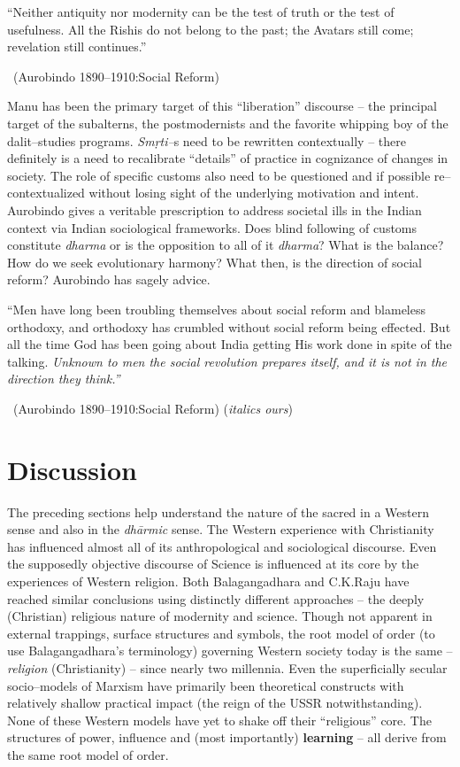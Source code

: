 \begin{myquote}
“Neither antiquity nor modernity can be the test of truth or the test of usefulness. All the Rishis do not belong to the past; the Avatars still come; revelation still continues.” 

~\hfill (Aurobindo 1890–1910:Social Reform)
\end{myquote}

Manu has been the primary target of this “liberation” discourse – the principal target of the subalterns, the postmodernists and the favorite whipping boy of the dalit–studies programs. \textit{Smṛti–}s need to be rewritten contextually – there definitely is a need to recalibrate “details” of practice in cognizance of changes in society. The role of specific customs also need to be questioned and if possible re–contextualized without losing sight of the underlying motivation and intent. Aurobindo gives a veritable prescription to address societal ills in the Indian context via Indian sociological frameworks. Does blind following of customs constitute \textit{dharma} or is the opposition to all of it \textit{dharma}? What is the balance? How do we seek evolutionary harmony? What then, is the direction of social reform? Aurobindo has sagely advice.

\begin{myquote}
“Men have long been troubling themselves about social reform and blameless orthodoxy, and orthodoxy has crumbled without social reform being effected. But all the time God has been going about India getting His work done in spite of the talking. \textit{Unknown to men the social revolution prepares itself, and it is not in the direction they think.”} 

~\hfill (Aurobindo 1890–1910:Social Reform) (\textit{italics ours})
\end{myquote}


\section*{Discussion}

The preceding sections help understand the nature of the sacred in a Western sense and also in the \textit{dhārmic} sense. The Western experience with Christianity has influenced almost all of its anthropological and sociological discourse. Even the supposedly objective discourse of Science is influenced at its core by the experiences of Western religion. Both Balagangadhara and C.K.Raju have reached similar conclusions using distinctly different approaches – the deeply (Christian) religious nature of modernity and science. Though not apparent in external trappings, surface structures and symbols, the root model of order (to use Balagangadhara's terminology) governing Western society today is the same – \textit{religion} (Christianity) – since nearly two millennia. Even the superficially secular socio–models of Marxism have primarily been theoretical constructs with relatively shallow practical impact (the reign of the USSR notwithstanding). None of these Western models have yet to shake off their “religious” core. The structures of power, influence and (most importantly) \textbf{learning} – all derive from the same root model of order.

